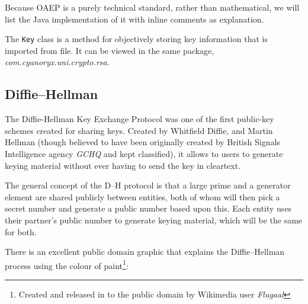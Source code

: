     Because OAEP is a purely technical standard, rather than mathematical, we will list the Java implementation of it with inline comments as explanation.
    
    
    
    The \verb!Key! class is a method for objectively storing key information that is imported from file. It can be viewed in the same package, \emph{com.cyanoryx.uni.crypto.rsa}.

  \subsection{Diffie--Hellman}
  
  The Diffie-Hellman Key Exchange Protocol was one of the first public-key schemes created for sharing keys. Created by Whitfield Diffie, and Martin Hellman (though believed to have been originally created by British Signals Intelligence agency \emph{GCHQ} and kept classified), it allows to users to generate keying material without ever having to send the key in cleartext.
  
  The general concept of the D--H protocol is that a large prime and a generator element are shared publicly between entities, both of whom will then pick a secret number and generate a public number based upon this. Each entity uses their partner's public number to generate keying material, which will be the same for both.
  
  There is an excellent public domain graphic that explains the Diffie--Hellman process using the colour of paint\footnote{Created and released in to the public domain by Wikimedia user \emph{Flugaal}}:
  
